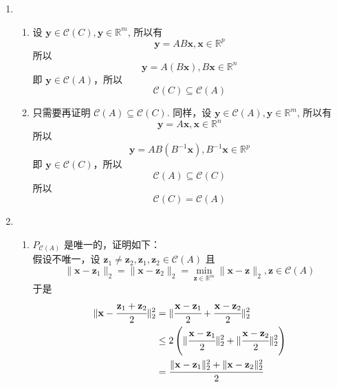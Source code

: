 \documentclass[11pt,letter,notitlepage]{article}
\begin{document}
\begin{solution}
    \begin{enumerate}
        \item \begin{enumerate}
                  \item 设 $\mathbf{y}\in\mathcal{C}(C), \mathbf{y} \in\mathbb{R}^m$, 所以有
                        $$\mathbf{y}=AB\mathbf{x}, \mathbf{x} \in\mathbb{R}^p$$
                        所以 $$\mathbf{y}=A(B\mathbf{x}), B\mathbf{x} \in \mathbb{R}^n$$
                        即 $\mathbf{y} \in \mathcal{C}(A)$，所以
                        $$\mathcal{C}(C)\subseteq\mathcal{C}(A)$$
                  \item
                        只需要再证明 $\mathcal{C}(A)\subseteq\mathcal{C}(C)$.
                        同样，设 $\mathbf{y}\in\mathcal{C}(A), \mathbf{y} \in\mathbb{R}^m$, 所以有
                        $$\mathbf{y}=A\mathbf{x}, \mathbf{x} \in\mathbb{R}^n$$
                        所以  $$\mathbf{y}=AB(B^{-1}\mathbf{x}), B^{-1}\mathbf{x} \in \mathbb{R}^p$$
                        即 $\mathbf{y} \in \mathcal{C}(C)$，所以
                        $$\mathcal{C}(A)\subseteq\mathcal{C}(C)$$
                        所以 $$\mathcal{C}(C)=\mathcal{C}(A)$$
              \end{enumerate}
        \item \begin{enumerate}
                  \item $P_{\mathcal{C}(A)}$ 是唯一的，证明如下： \\
                        假设不唯一，设 $\mathbf{z}_1 \neq \mathbf{z}_2, \mathbf{z}_1,\mathbf{z}_2 \in \mathcal{C}(A)$ 且
                        $$\|\mathbf{x}-\mathbf{z}_1\|_2=\|\mathbf{x}-\mathbf{z}_2\|_2
                            =\min_{\mathbf{z}\in\mathbb{R}^m} \|\mathbf{x}-\mathbf{z}\|_2, \mathbf{z}\in \mathcal{C}(A)$$
                        于是
                        $$\begin{aligned}
                                \|\mathbf{x}-\cfrac{\mathbf{z}_1+\mathbf{z}_2}{2}\|_2^2
                                 & = \| \cfrac{\mathbf{x}-\mathbf{z}_1}{2}+\cfrac{\mathbf{x}-\mathbf{z}_2}{2} \|_2^2                             \\
                                 & \leq 2 \left( \|\cfrac{\mathbf{x}-\mathbf{z}_1}{2}\|_2^2 + \|\cfrac{\mathbf{x}-\mathbf{z}_2}{2}\|_2^2 \right) \\
                                 & = \cfrac{\|\mathbf{x}-\mathbf{z}_1\|_2^2+\|\mathbf{x}-\mathbf{z}_2\|_2^2}{2}                                  \\

\end{aligned}$$
\end{enumerate}
\end{enumerate}
\end{solution}
\end{document}
